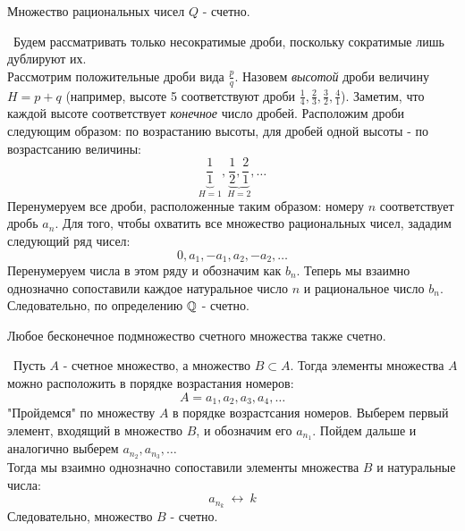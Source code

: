 
\begin{theorem}
    Множество рациональных чисел \(Q\) - счетно.

    \vspace{2mm}

    \proofname~Будем рассматривать только несократимые дроби,
    поскольку сократимые лишь дублируют их. \\
    Рассмотрим положительные дроби вида \(\frac{p}{q}\). Назовем \textit{высотой}
    дроби величину \(H = p+q\) (например, высоте 5 соответствуют дроби
    \(\frac{1}{4}, \frac{2}{3}, \frac{3}{2}, \frac{4}{1}\)). 
    Заметим, что каждой высоте соответствует \textit{конечное} число дробей.
    Расположим дроби следующим образом: по возрастанию высоты, 
    для дробей одной высоты - по возрастсанию величины:
    \[\underbrace{\frac{1}{1}}_{H=1}, \underbrace{\frac{1}{2}, \frac{2}{1}}_{H=2}, \dots\]
    Перенумеруем все дроби, расположенные таким образом:
    номеру \(n\) соответствует дробь \(a_{n}\).
    Для того, чтобы охватить все множество рациональных чисел, зададим 
    следующий ряд чисел:
    \[0, a_{1}, -a_{1}, a_{2}, -a_{2}, \dots \]
    Перенумеруем числа в этом ряду и обозначим как \(b_{n}\).
    Теперь мы взаимно однозначно сопоставили
    каждое натуральное число \(n\) и рациональное число \(b_{n}\).
    Следовательно, по определению \(\mathbb{Q}\) - счетно.~\qedsymbol
\end{theorem}

\begin{lemma}
    Любое бесконечное подмножество счетного множества также счетно.

    \vspace{2mm}

    \proofname~Пусть \(A\) - счетное множество, а множество \(B\subset A\).
    Тогда элементы множества \(A\) можно расположить в порядке возрастания номеров:
    \[A = {a_{1},a_{2},a_{3},a_{4},\dots}\]
    "Пройдемся" по множеству \(A\) в порядке возрастсания номеров.
    Выберем первый элемент, входящий в множество \(B\), и обозначим его \(a_{n_{1}}\).
    Пойдем дальше и аналогично выберем \(a_{n_{2}},a_{n_{3}},\dots\)\\
    Тогда мы взаимно однозначно сопоставили элементы множества \(B\) и натуральные числа:
    \[a_{n_{k}}~\longleftrightarrow~k\]
    Следовательно, множество \(B\) - счетно.
\end{lemma}

